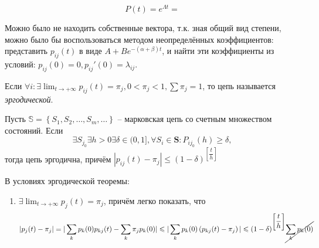 \begin{ex}
  \[
    P(t) = e^{\Lambda t} = 
  \]

  Можно было не находить собственные вектора, т.к. зная общий вид
  степени, можно было бы воспользоваться методом неопределённых коэффициентов:
  представить $p_{ij}(t)$ в виде $A + B e^{-(\alpha+\beta) t}$, и найти 
  эти коэффициенты из условий: $p_{ij}(0) = 0, p_{ij}'(0) = \lambda_{ij}$.
\end{ex}

\begin{definition}
  Если $ \forall i : \exists \lim_{t\to +\infty} p_{ij}(t) = \pi_j, 0 < \pi_j < 1, \sum \pi_j = 1$,
  то цепь называется \emph{эргодической}.
\end{definition}

\begin{theorem}[эргодическая]
  Пусть $\mathbb{S} = \left\{ S_1, S_2, \dots, S_m, \dots \right\} $ --
  марковская цепь со счетным множеством состояний. Если
  \[
    \exists S_{j_0} \exists h>0 \exists \delta \in(0, 1], \forall S_i \in \mathbf{S} : P_{ij_0}(h) \geqslant \delta,
  \]
  тогда цепь эргодична, причём $|p_{ij}(t) - \pi_j| \leqslant (1-\delta)^{\left[\dfrac{t}{h}\right]}$
\end{theorem}

\begin{corollary}
  В условиях эргодической теоремы:
  \begin{enumerate}
    \item $\exists \lim_{t\to +\infty} p_j(t) = \pi_j$, причём легко показать, 
      что
      \[
        |p_j(t) - \pi_j| = |\sum_{k} p_k(0) p_{kj}(t) - \sum_{k} \pi_j p_{k}(0)|
        \leqslant |\sum_k p_k(0) \left( p_{kj}(t) - \pi_j \right) |
        \leqslant (1-\delta)^{ \left[ \dfrac{t}{h} \right] } \cancel{\sum_{k} p_k(0)}
      \]
  \end{enumerate}
\end{corollary}
